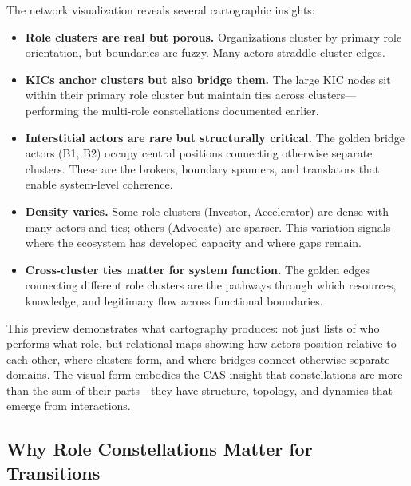 \documentclass[../main.tex]{subfiles}
\begin{document}
The network visualization reveals several cartographic insights:

\begin{itemize}[leftmargin=*, itemsep=0.2em]
\item \textbf{Role clusters are real but porous.} Organizations cluster by primary role orientation, but boundaries are fuzzy. Many actors straddle cluster edges.

\item \textbf{KICs anchor clusters but also bridge them.} The large KIC nodes sit within their primary role cluster but maintain ties across clusters---performing the multi-role constellations documented earlier.

\item \textbf{Interstitial actors are rare but structurally critical.} The golden bridge actors (B1, B2) occupy central positions connecting otherwise separate clusters. These are the brokers, boundary spanners, and translators that enable system-level coherence.

\item \textbf{Density varies.} Some role clusters (Investor, Accelerator) are dense with many actors and ties; others (Advocate) are sparser. This variation signals where the ecosystem has developed capacity and where gaps remain.

\item \textbf{Cross-cluster ties matter for system function.} The golden edges connecting different role clusters are the pathways through which resources, knowledge, and legitimacy flow across functional boundaries.
\end{itemize}


This preview demonstrates what cartography produces: not just lists of who performs what role, but relational maps showing how actors position relative to each other, where clusters form, and where bridges connect otherwise separate domains. The visual form embodies the CAS insight that constellations are more than the sum of their parts---they have structure, topology, and dynamics that emerge from interactions.

\subsection{Why Role Constellations Matter for Transitions}
\end{document}
